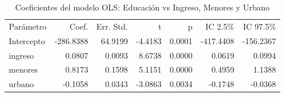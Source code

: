 \begin{table}[H]
    \centering
    \color{blue}
    \caption{Coeficientes del modelo OLS: Educación vs Ingreso, Menores y Urbano}
    \label{tab:ols_coef_educacion}
    \begin{tabular}{lrrrrrr}
        
            Parámetro & Coef. & Err. Std. & t & p & IC 2.5\% & IC 97.5\% \\
        
            Intercepto & -286.8388 & 64.9199 & -4.4183 & 0.0001 & -417.4408 & -156.2367 \\
            ingreso & 0.0807 & 0.0093 & 8.6738 & 0.0000 & 0.0619 & 0.0994 \\
            menores & 0.8173 & 0.1598 & 5.1151 & 0.0000 & 0.4959 & 1.1388 \\
            urbano & -0.1058 & 0.0343 & -3.0863 & 0.0034 & -0.1748 & -0.0368 \\
        
    \end{tabular}
\end{table}
